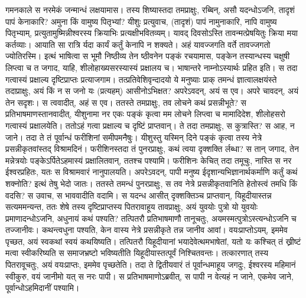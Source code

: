\adhyAya
{}
\vakya गमनकाले स नरमेकं जन्मान्धं लक्षयामास।
\vakya तस्य शिष्यास्तदा तमप्राक्षुः, रब्बिन्, असौ यदन्धोऽजनि, तादृशं पापं केनाकारि? अमुना किं वामुष्य पितृभ्यां?
\vakya यीशुः प्रत्युवाच, (तादृशं) पापं नामुनाकारि, नापि वामुष्य पितृभ्याम्, प्रत्युतामुष्मिन्नीश्वरस्य क्रियाभिः प्रत्यक्षीभवितव्यम्।
\vakya यावद् दिवसोऽस्ति तावन्मत्प्रेषयितुः क्रिया मया कर्तव्याः। आयाति सा रात्रि र्यदा कार्यं कर्तुं केनापि न शक्यते।
\vakya अहं यावज्जगति वर्ते तावज्जगतो ज्योतिरस्मि।
\vakya इत्थं भाषित्वा स भूमौ निष्ठीव्य तेन ष्ठीवनेन पङ्कं रचयामास, पङ्केन तस्यान्धस्य चक्षुषी लिप्त्वा च त जगाद,
\vakya याहि, शीलोहाख्यसरस्यास्यं प्रक्षालय च। भाषान्तरे नाम्नोऽस्यार्थः प्रहित इति। स तदा गत्वास्यं प्रक्षाल्य दृष्टिप्राप्तः प्रत्याजगाम।
\vakya तत्प्रतिवेशिवृन्दादयो ये मनुष्याः प्राक् तमन्धं ज्ञात्वालक्षयंस्ते तदाप्राक्षुः, अयं किं न स जनो यः (प्रत्यहम्) आसीनोऽभिक्षत?
\vakya अपरेऽवदन्, अयं स एव। अपरे चावदन्, अयं तेन सदृशः। स त्ववादीत्, अहं स एव।
\vakya ततस्ते तमप्राक्षुः, तव लोचने कथं प्रसन्नीभूते?
\vakya स प्रतिभाषमाणस्तानवादीत्, यीशुनामा नर एकः पङ्कं कृत्वा मम लोचने लिप्त्वा च मामादिदेश, शीलोहसरो गत्वास्यं प्रक्षालयेति। ततोऽहं गत्वा प्रक्षाल्य च दृष्टिं प्राप्तवान्।
\vakya ते तदा तमप्राक्षुः, स कुत्रास्ति? स आह, न जाने।
\vakya तदा ते तं पूर्वान्धं फरीशिनां समीपमनैषुः।
\vakya यीशुस्तु यस्मिन् दिने पङ्कं कृत्वा तस्य नेत्रे प्रसन्नीकृतवांस्तद् विश्रामदिनं।
\vakya फरीशिनस्तदा तं पुनरप्राक्षुः, कथं त्वया दृक्शक्ति र्लब्धा? स तान् जगाद, तेन मन्नेत्रयोः पङ्केऽर्पितेऽहमास्यं प्रक्षालितवान्, ततश्च पश्यामि।
\vakya फरीशिनः केचित् तदा तमूचुः, नास्ति स नर ईश्वरप्रहितः, यतः स विश्रामवारं नानुपालयति। अपरेऽवदन्, पापी मनुष्य ईदृशान्यभिज्ञानार्थकर्माणि कर्तुं कथं शक्नोति? इत्थं तेषु भेदो जातः।
\vakya ततस्ते तमन्धं पुनरप्राक्षुः, स तव नेत्रे प्रसन्नीकृतवानिति हेतोस्त्वं तमधि किं वदसि? स उवाच, स भाववादीति वदामि।
\vakya स यदन्ध आसीत् दृक्शक्तिञ्च प्राप्तवान्, यिहूदीयास्तन्न सत्यममन्यन्त, ततः शेषे तस्य दृष्टिप्राप्तस्य पितरावाहूय तावप्राक्षुः,
\vakya अयं युवयोः पुत्रो यो युवयोः प्रमाणादन्धोऽजनि, अधुनायं कथं पश्यति?
\vakya तत्पितरौ प्रतिभाषमाणौ तानूचतुः, अयमस्मत्पुत्रोऽस्त्यन्धोऽजनि च तज्जानीवः।
\vakya कथन्त्वधुना पश्यति, केन वास्य नेत्रे प्रसन्नीकृते तन्न जानीव आवां। वयःप्राप्तोऽयम्, इममेव पृच्छत, अयं स्वकथां स्वयं कथयिष्यति।
\vakya तत्पितरौ यिहूदीयानां भयादेवेत्थमभाषेतां, यतो यः कश्चित् तं ख्रीष्टं मत्वा स्वीकरिष्यति स समाजभ्रष्टो भविष्यतीति यिहूदीयास्तत्पूर्वं निश्चितवन्तः।
\vakya तत्कारणात् तस्य पितरावूचतुः, अयं वयःप्राप्तः, इममेव पृच्छतेति।
\vakya तदा ते द्वितीयवारं तं पूर्वान्धमाहूय जगदुः, ईश्वरस्य महिमानं स्वीकुरु, वयं जानीमो यत् स नरः पापी।
\vakya स प्रतिभाषमाणोऽब्रवीत्, स पापी न वेत्यहं न जाने, एकमेव जाने, पूर्वान्धोऽहमिदानीं पश्यामि।
